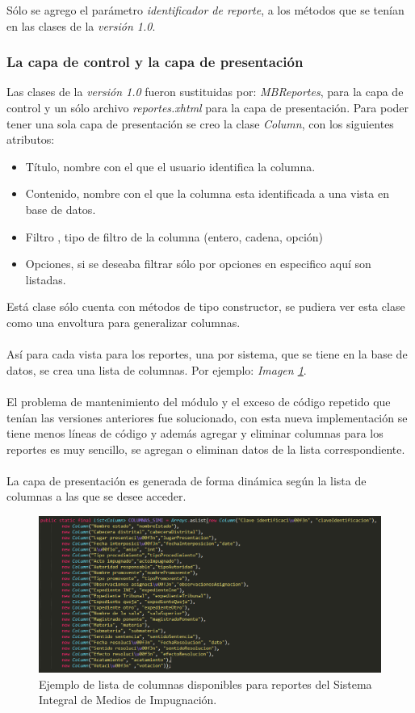 \documentclass[../reportesINE.tex]{subfiles}
\begin{document}
Sólo se agrego el parámetro \textit{identificador de reporte}, a los métodos que se tenían en las clases de la \textit{versión 1.0}. 

\subsubsection{La capa de control y la capa de presentación}
Las clases de la \textit{versión 1.0} fueron sustituidas por: \textit{MBReportes}, para la capa de control y un sólo archivo \textit{reportes.xhtml} para la capa de presentación. 
Para poder tener una sola capa de presentación se creo la clase \textit{Column}, con los siguientes atributos: 
\begin{itemize}
\item Título, nombre con el que el usuario identifica la columna.  
\item Contenido, nombre con el que la columna esta identificada a una vista en base de datos.
\item Filtro , tipo de filtro de la columna (entero, cadena, opción)
\item Opciones, si se deseaba filtrar sólo por opciones en especifico aquí son listadas.
\end{itemize}
Está clase sólo cuenta con métodos de tipo constructor, se pudiera ver esta clase como una envoltura para generalizar columnas.  \\ \\
Así para cada vista  para los reportes, una por sistema,  que se tiene en la base de datos, se crea una lista de columnas. Por ejemplo: \textit{Imagen \ref{fig:ejemploColumna}}. \\ \\
El problema de mantenimiento del módulo y el exceso de código repetido que tenían las versiones anteriores fue solucionado, con esta nueva implementación se tiene menos líneas de código y además agregar y eliminar columnas para los 
reportes es muy sencillo, se agregan o eliminan datos de la lista correspondiente. \\ \\
La capa de presentación es generada de forma dinámica según la lista de columnas a las que se desee acceder. 

\begin{figure}[h]
  \centering
  \includegraphics[width=\linewidth]{img/ejemploColumna.PNG}
  \caption{Ejemplo de lista de columnas disponibles para reportes del Sistema Integral de Medios de Impugnación. }
  \label{fig:ejemploColumna}
\end{figure}
\end{document}
